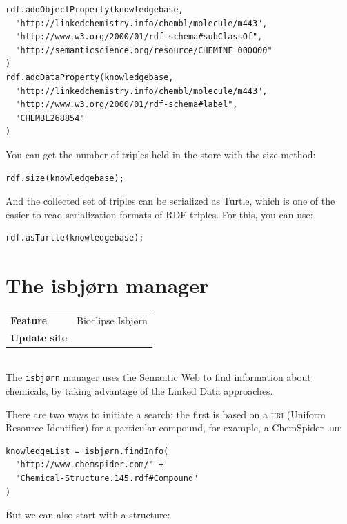 \documentclass[a5paper, 10pt]{memoir}
\begin{document}
\begin{refsection}
\begin{Verbatim}
rdf.addObjectProperty(knowledgebase,
  "http://linkedchemistry.info/chembl/molecule/m443",
  "http://www.w3.org/2000/01/rdf-schema#subClassOf",
  "http://semanticscience.org/resource/CHEMINF_000000"
)
rdf.addDataProperty(knowledgebase,
  "http://linkedchemistry.info/chembl/molecule/m443",
  "http://www.w3.org/2000/01/rdf-schema#label",
  "CHEMBL268854"
)
\end{Verbatim}

You can get the number of triples held in the store with the size
method:

\begin{Verbatim}
rdf.size(knowledgebase);
\end{Verbatim}

And the collected set of triples can be serialized as Turtle, which
is one of the easier to read serialization formats of RDF triples.
For this, you can use:

\begin{Verbatim}
rdf.asTurtle(knowledgebase);
\end{Verbatim}


\section{The isbjørn manager}

\begin{tabular}{ll}
\textbf{Feature} & Bioclipse Isbjørn \\
\textbf{Update site} & \url{} \\
\end{tabular} \\

\noindent
The \texttt{isbjørn} manager uses the Semantic Web to find information about
chemicals, by taking advantage of the Linked Data approaches.

There are two ways to initiate a search: the first is based on a \textsc{uri}
(Uniform Resource Identifier) for a particular compound, for
example, a ChemSpider \textsc{uri}:

\begin{Verbatim}
knowledgeList = isbjørn.findInfo(
  "http://www.chemspider.com/" +
  "Chemical-Structure.145.rdf#Compound"
)
\end{Verbatim}
But we can also start with a structure:


\end{refsection}
\end{document}
